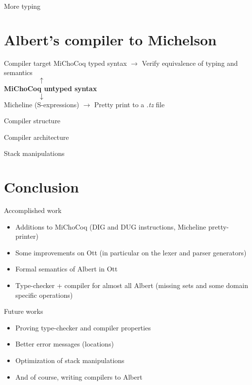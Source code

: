 \documentclass[aspectratio=169]{beamer}
\begin{document}
\begin{frame}{More typing}
\end{frame}

\section{Albert's compiler to Michelson}

\begin{frame}{Compiler target}
  MiChoCoq typed syntax $\rightarrow$ Verify equivalence of typing and semantics \\
  $\mspace{90mu} \uparrow $ \\
  \textbf{MiChoCoq untyped syntax} \\
  $\mspace{90mu} \downarrow $ \\
  Micheline (S-expressions) $\rightarrow$ Pretty print to a \textit{.tz} file
\end{frame}

\begin{frame}{Compiler structure}
\end{frame}

\begin{frame}{Compiler architecture}
\end{frame}

\begin{frame}{Stack manipulations}
\end{frame} 

\section{Conclusion}

\begin{frame}{Accomplished work}
  \begin{itemize}
  \item Additions to MiChoCoq (DIG and DUG instructions, Micheline pretty-printer)
  \item Some improvements on Ott (in particular on the lexer and parser generators)
  \item Formal semantics of Albert in Ott
  \item Type-checker + compiler for almost all Albert (missing sets and some domain specific operations)
  \end{itemize}
\end{frame}

\begin{frame}{Future works}
  \begin{itemize}
  \item Proving type-checker and compiler properties
  \item Better error messages (locations)
  \item Optimization of stack manipulations
  \item And of course, writing compilers to Albert
  \end{itemize}
\end{frame}
\end{document}
